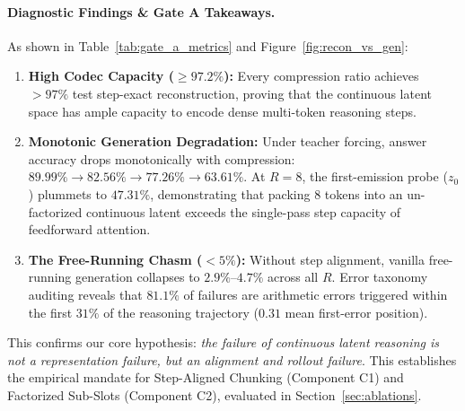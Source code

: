 \paragraph{Diagnostic Findings & Gate A Takeaways.}
As shown in Table~\ref{tab:gate_a_metrics} and Figure~\ref{fig:recon_vs_gen}:
\begin{enumerate}[leftmargin=*]
    \item \textbf{High Codec Capacity ($\ge 97.2\%$):} Every compression ratio achieves $>97\%$ test step-exact reconstruction, proving that the continuous latent space has ample capacity to encode dense multi-token reasoning steps.
    \item \textbf{Monotonic Generation Degradation:} Under teacher forcing, answer accuracy drops monotonically with compression: $89.99\% \to 82.56\% \to 77.26\% \to 63.61\%$. At $R = 8$, the first-emission probe ($z_0$) plummets to $47.31\%$, demonstrating that packing 8 tokens into an un-factorized continuous latent exceeds the single-pass step capacity of feedforward attention.
    \item \textbf{The Free-Running Chasm ($<5\%$):} Without step alignment, vanilla free-running generation collapses to $2.9\%$--$4.7\%$ across all $R$. Error taxonomy auditing reveals that $81.1\%$ of failures are arithmetic errors triggered within the first $31\%$ of the reasoning trajectory ($0.31$ mean first-error position).
\end{enumerate}
This confirms our core hypothesis: \emph{the failure of continuous latent reasoning is not a representation failure, but an alignment and rollout failure}. This establishes the empirical mandate for Step-Aligned Chunking (Component C1) and Factorized Sub-Slots (Component C2), evaluated in Section~\ref{sec:ablations}.
